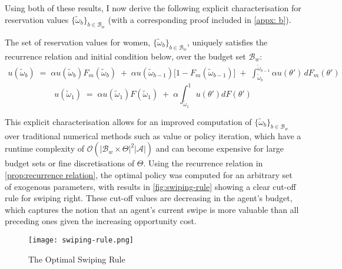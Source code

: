 Using both of these results, I now derive the following explicit characterisation for reservation values $\{\widetilde\omega_b\}_{b\in \mathcal{B}_w}$ (with a corresponding proof included in \autoref{appx: b}). 
\begin{proposition}\label{prop:recurrence relation}
The set of reservation values for women, $\{\widetilde\omega_b\}_{b\in \mathcal{B}_w}$, uniquely satisfies the recurrence relation and initial condition below, over the budget set $\mathcal{B}_w$: 
\begin{equation}\label{eq:recurrence relation}
    \begin{aligned}
        u(\widetilde \omega_b) \;=\; \alpha u(\widetilde \omega_b) F_m(\widetilde \omega_b) \;+\; \alpha u(\widetilde \omega_{b-1}) \Big[1- F_m(\widetilde \omega_{b-1})\Big] \;+\; \int^{\widetilde \omega_{b-1}}_{\widetilde \omega_b} \alpha u(\theta')\,dF_m(\theta')
    \end{aligned} 
\end{equation}  
\begin{equation}\label{eq:initial condition}
    u(\widetilde\omega_1) \;=\; \alpha u(\widetilde\omega_1)F(\widetilde\omega_1) \;+\; \alpha \int^1_{\widetilde\omega_1}u(\theta')dF(\theta')
\end{equation}
\end{proposition}  

This explicit characterisation allows for an improved computation of $\{\widetilde\omega_b\}_{b\in \mathcal{B}_w}$ over traditional numerical methods such as value or policy iteration, which have a runtime complexity of $\mathcal{O}(|\mathcal{B}_w\times\Theta|^2|\mathcal{A}|)$ and can become expensive for large budget sets or fine discretisations of $\Theta$. Using the recurrence relation in \autoref{prop:recurrence relation}, the optimal policy was computed for an arbitrary set of exogenous parameters, with results in \autoref{fig:swiping-rule} showing a clear cut-off rule for swiping right. 
These cut-off values are decreasing in the agent's budget, which captures the notion that an agent's current swipe is more valuable than all preceding ones given the increasing opportunity cost.

\begin{figure}[ht]
    \centering
    \caption{The Optimal Swiping Rule}
    \texttt{[image: swiping-rule.png]}
    \label{fig:swiping-rule} 
\end{figure} 